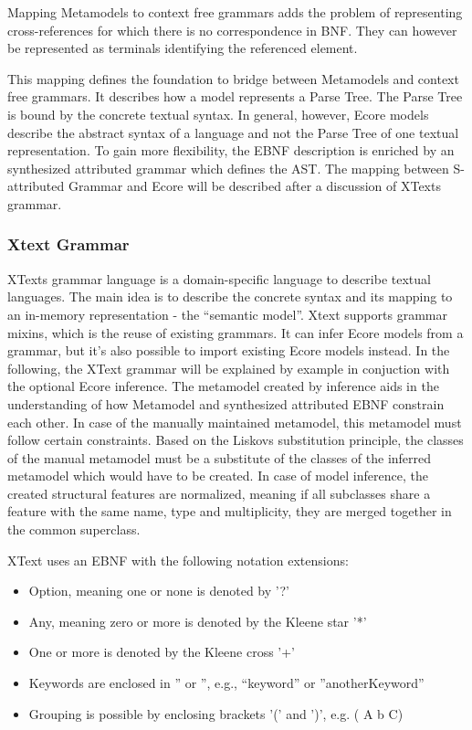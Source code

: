 Mapping Metamodels to context free grammars adds the problem of representing cross-references for which there is no correspondence in BNF. They can however be represented as terminals identifying the referenced element.   

This mapping defines the foundation to bridge between Metamodels and context free grammars. It describes how a model represents a Parse Tree. The Parse Tree is bound by the concrete textual syntax. In general, however, Ecore models describe the abstract syntax of a language and not the Parse Tree of one textual representation. To gain more flexibility, the EBNF description is enriched by an synthesized attributed grammar which defines the AST. The mapping between S-attributed Grammar and Ecore will be described after a discussion of XTexts grammar.


\subsubsection{Xtext Grammar}
XTexts grammar language is a domain-specific language to describe textual languages. The main idea is to describe the concrete syntax and its mapping to an in-memory representation - the ``semantic model''. Xtext supports grammar mixins, which is the reuse of existing grammars. It can infer Ecore models from a grammar, but it's also possible to import existing Ecore models instead. In the following, the XText grammar will be explained by example in conjuction with the optional Ecore inference. The metamodel created by inference aids in the understanding of how Metamodel and synthesized attributed EBNF constrain each other. In case of the manually maintained metamodel, this metamodel must follow certain constraints. Based on the Liskovs substitution principle, the classes of the manual metamodel must be a substitute of the classes of the inferred metamodel which would have to be created. In case of model inference, the created structural features are normalized, meaning if all subclasses share a feature with the same name, type and multiplicity, they are merged together in the common superclass.

XText uses an EBNF with the following notation extensions:
\begin{itemize}
	\item Option, meaning one or none is denoted by '?'
	\item Any, meaning zero or more is denoted by the Kleene star '*'
	\item One or more is denoted by the Kleene cross '+'
	\item Keywords are enclosed in '' or '', e.g., ``keyword'' or ''anotherKeyword''
	\item Grouping is possible by enclosing brackets '(' and  ')', e.g.  ( A b C)
\end{itemize}

